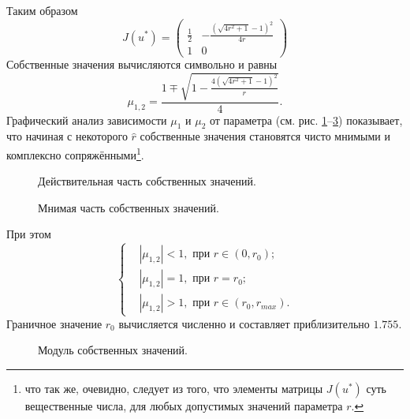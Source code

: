 \documentclass[oneside,final,12pt]{article}
\newcommand*\abs[1]{|#1|}
\newcommand*\inter[2]{(#1,#2)}
\newcommand*\subpicsize{0.45\textwidth}
\newcommand*\picpath{pictures/}
\theoremstyle{plain}
\theoremstyle{remark}
\theoremstyle{definition}
\theoremstyle{plain}
\begin{document}
		Таким образом
			\[J(u^*) = \begin{pmatrix} \frac{1}{2} & -\frac{(\sqrt{4r^2+1}-1)^2}{4r} \\[5pt] 1 & 0 \end{pmatrix} \]
		Собственные значения вычисляются символьно и равны
			\[\mu_{1,2} = \frac{1\mp \sqrt{1-\frac{4(\sqrt{4r^2+1}-1)^2}{r}}}{4}.\]
		Графический анализ зависимости  \(\mu_1\) и \(\mu_2\) от параметра (см. рис. \ref{ds2_mu12_re}--\ref{ds2_mu12_abs}) показывает, что начиная с некоторого \(\hat r\) собственные значения становятся чисто мнимыми и комплексно сопряжёнными\footnote{что так же, очевидно, следует из того, что элементы матрицы \(J(u^*)\) суть вещественные числа, для любых допустимых значений параметра \(r\).}.

		\begin{figure}[!h]
			\centering
			\qquad
			\caption{Действительная часть собственных значений.} \label{ds2_mu12_re}
		\end{figure}

		\begin{figure}[!h]
			\centering
			\qquad
			\caption{Мнимая часть собственных значений.} \label{ds2_mu12_im}
		\end{figure}

При этом 
	\[\begin{cases}
		&\abs{\mu_{1,2}} < 1, \text{ при } r \in \inter{0}{r_0};\\
		&\abs{\mu_{1,2}} = 1, \text{ при } r = r_0;\\
		&\abs{\mu_{1,2}} > 1, \text{ при } r \in \inter{r_0}{r_{max}}.
	\end{cases}\]
Граничное значение \(r_0\) вычисляется численно и составляет приблизительно \(1.755\).

		\begin{figure}[!h]
			\centering
			\qquad
			\caption{Модуль собственных значений.} \label{ds2_mu12_abs}
		\end{figure}
\end{document}
